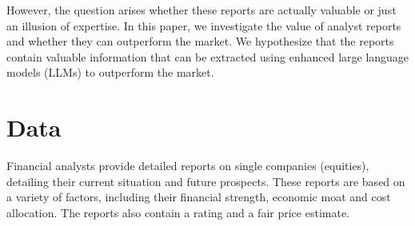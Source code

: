 \documentclass[conference]{IEEEtran}
\begin{document}
However, the question arises whether these reports are actually valuable or just an illusion of expertise. In this paper, we investigate the value of analyst reports and whether they can outperform the market. We hypothesize that the reports contain valuable information that can be extracted using enhanced large language models (LLMs) to outperform the market.
\section{Data} %
Financial analysts provide detailed reports on single companies (equities), detailing their current situation and future prospects. These reports are based on a variety of factors, including their financial strength, economic moat and cost allocation. The reports also contain a rating and a fair price estimate. 
\end{document}
